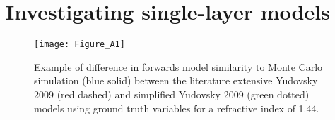 \section{Investigating single-layer models}
\begin{figure}[htb!]
    \centering
    \texttt{[image: Figure\_A1]}
    \caption{Example of difference in forwards model similarity to Monte Carlo simulation (blue solid) between the literature extensive Yudovsky 2009 (red dashed) and simplified Yudovsky 2009 (green dotted) models using ground truth variables for a refractive index of 1.44.}
 \label{fig:badYudovsky}
\end{figure}
\FloatBarrier



